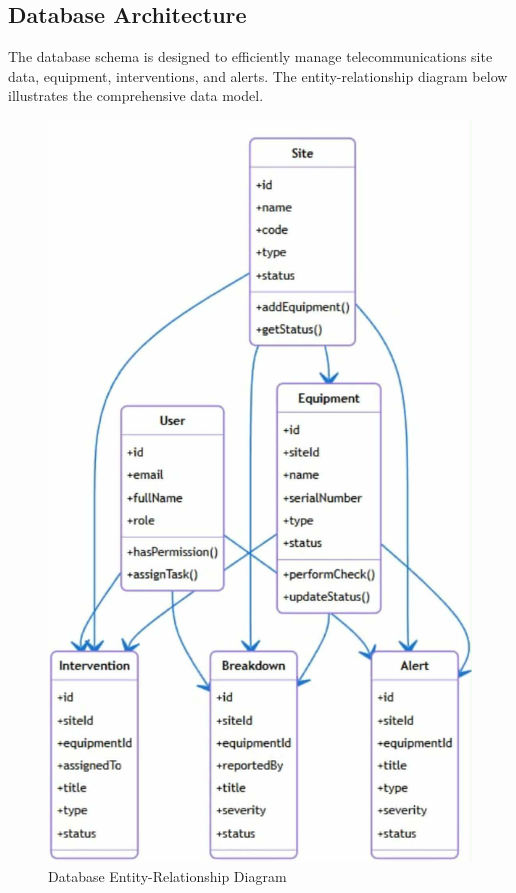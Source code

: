 \subsection{Database Architecture}
The database schema is designed to efficiently manage telecommunications site data, equipment, interventions, and alerts. The entity-relationship diagram below illustrates the comprehensive data model.

\begin{figure}[hbt!]
    \centering
    \includegraphics[width=0.95\linewidth]{img/chap_02/database_er_diagram.png}
    \caption{Database Entity-Relationship Diagram}
    \label{fig:database_er_diagram}
\end{figure}

